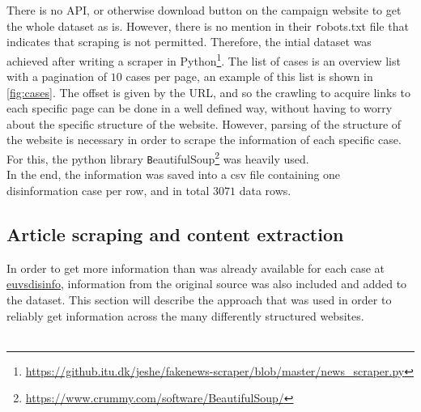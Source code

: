 \documentclass{article}
\begin{document}
There is no API, or otherwise download button on the campaign website to get the whole dataset as is. However, there is no mention in their {\texttt robots.txt} file that indicates that scraping is not permitted. Therefore, the intial dataset was achieved after writing a scraper in Python\footnote{\url{https://github.itu.dk/jeshe/fakenews-scraper/blob/master/news_scraper.py}}. The list of cases is an overview list with a pagination of $10$ cases per page, an example of this list is shown in \cref{fig:cases}. The offset is given by the URL, and so the crawling to acquire links to each specific page can be done in a well defined way, without having to worry about the specific structure of the website.
However, parsing of the structure of the website is necessary in order to scrape the information of each specific case. For this, the python library {\texttt BeautifulSoup}\footnote{\url{https://www.crummy.com/software/BeautifulSoup/}} was heavily used.\\
In the end, the information was saved into a csv file containing one disinformation case per row, and in total $3071$ data rows.

\subsection{Article scraping and content extraction}
In order to get more information than was already available for each case at \url{euvsdisinfo}, information from the original source was also included and added to the dataset. This section will describe the approach that was used in order to reliably get information across the many differently structured websites.
\\\\
\end{document}
